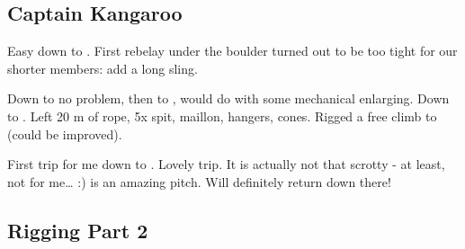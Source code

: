 \subsection{Captain Kangaroo}


Easy down to . First rebelay under the boulder turned out
to be too tight for our shorter members: add a long sling.

Down to  no problem, then to ,
 would do with some mechanical enlarging. Down to
. Left 20 m of rope, 5x spit, maillon, hangers,
cones. Rigged a free climb to  (could be improved).


First trip for me down to . Lovely trip. It is
actually not that scrotty - at least, not for me\ldots{} :) 
is an amazing pitch. Will definitely return down there!



\subsection{\protect{} Rigging Part 2}

 

